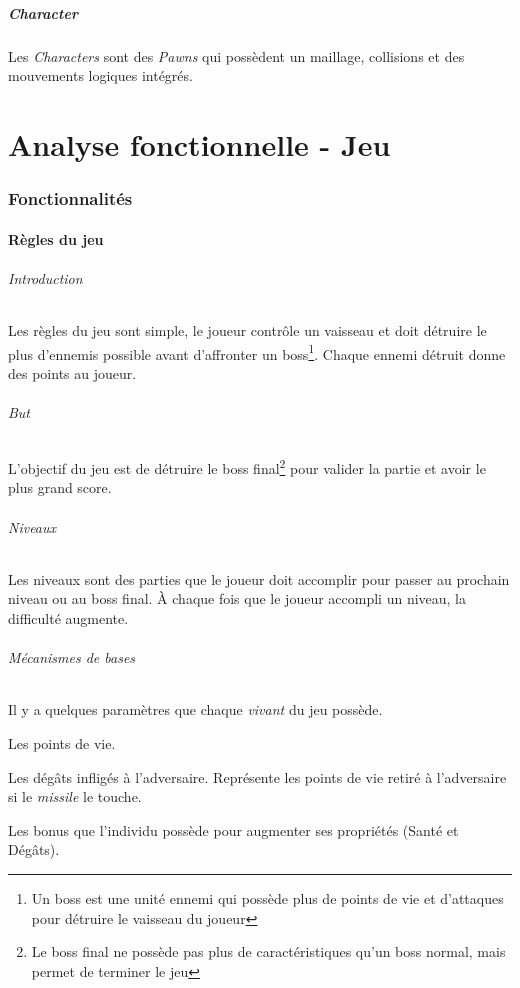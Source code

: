 \documentclass[11pt, a4paper, oneside]{article}
\begin{document}
\subsubsection{Character}
Les \emph{Characters} sont des \emph{Pawns} qui possèdent un maillage, collisions et des mouvements logiques intégrés.

\newpage
\part{Analyse fonctionnelle - Jeu}
\section{Fonctionnalités}
\subsection{Règles du jeu}
\paragraph{Introduction}
Les règles du jeu sont simple, le joueur contrôle un vaisseau et doit détruire le plus d'ennemis possible avant d'affronter un boss\footnote{Un boss est une unité ennemi qui possède plus de points de vie et d'attaques pour détruire le vaisseau du joueur}. Chaque ennemi détruit donne des points au joueur.
\paragraph{But}
L'objectif du jeu est de détruire le boss final\footnote{Le boss final ne possède pas plus de caractéristiques qu'un boss normal, mais permet de terminer le jeu} pour valider la partie et avoir le plus grand score.
\paragraph{Niveaux}
Les niveaux sont des parties que le joueur doit accomplir pour passer au prochain niveau ou au boss final. À chaque fois que le joueur accompli un niveau, la difficulté augmente.
\paragraph{Mécanismes de bases}
Il y a quelques paramètres que chaque \emph{vivant} du jeu possède.
\begin{description}
\setlength{\itemindent}{-.cm}
	\item[— Santé] Les points de vie.
	\item[— Dégâts] Les dégâts infligés à l'adversaire. Représente les points de vie retiré à l'adversaire si le \emph{missile} le touche.
	\item[— Bonus] Les bonus que l'individu possède pour augmenter ses propriétés (Santé et Dégâts).
\end{description}
\end{document}
